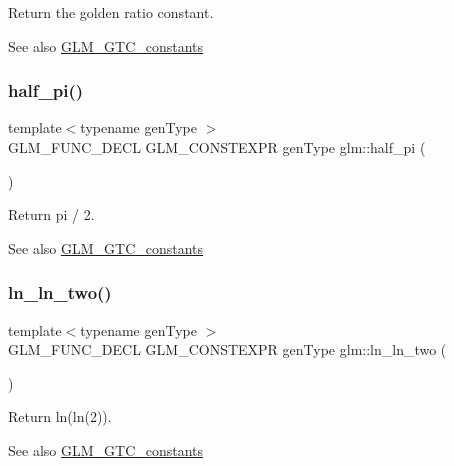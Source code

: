 Return the golden ratio constant. \begin{DoxySeeAlso}{See also}
\hyperlink{group__gtc__constants}{G\+L\+M\+\_\+\+G\+T\+C\+\_\+constants} 
\end{DoxySeeAlso}
\mbox{\label{group__gtc__constants_ga0c36b41d462e45641faf7d7938948bac}} 
\subsubsection{\texorpdfstring{half\+\_\+pi()}{half\_pi()}}
{\footnotesize\ttfamily template$<$typename gen\+Type $>$ \\
G\+L\+M\+\_\+\+F\+U\+N\+C\+\_\+\+D\+E\+CL G\+L\+M\+\_\+\+C\+O\+N\+S\+T\+E\+X\+PR gen\+Type glm\+::half\+\_\+pi (\begin{DoxyParamCaption}{ }\end{DoxyParamCaption})}

Return pi / 2. \begin{DoxySeeAlso}{See also}
\hyperlink{group__gtc__constants}{G\+L\+M\+\_\+\+G\+T\+C\+\_\+constants} 
\end{DoxySeeAlso}
\mbox{\label{group__gtc__constants_gaca94292c839ed31a405ab7a81ae7e850}} 
\subsubsection{\texorpdfstring{ln\+\_\+ln\+\_\+two()}{ln\_ln\_two()}}
{\footnotesize\ttfamily template$<$typename gen\+Type $>$ \\
G\+L\+M\+\_\+\+F\+U\+N\+C\+\_\+\+D\+E\+CL G\+L\+M\+\_\+\+C\+O\+N\+S\+T\+E\+X\+PR gen\+Type glm\+::ln\+\_\+ln\+\_\+two (\begin{DoxyParamCaption}{ }\end{DoxyParamCaption})}

Return ln(ln(2)). \begin{DoxySeeAlso}{See also}
\hyperlink{group__gtc__constants}{G\+L\+M\+\_\+\+G\+T\+C\+\_\+constants} 
\end{DoxySeeAlso}
\mbox{\label{group__gtc__constants_gaf97ebc6c059ffd788e6c4946f71ef66c}} 
